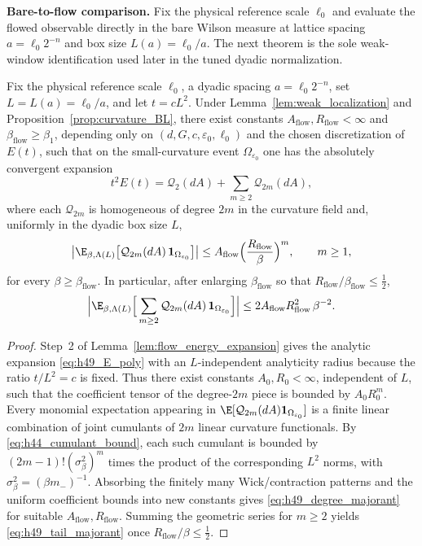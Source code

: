 \medskip
\noindent\textbf{Bare-to-flow comparison.}
Fix the physical reference scale $\ell_0$ and evaluate the flowed observable directly in the bare Wilson measure at lattice spacing
$a=\ell_0 2^{-n}$ and box size $L(a)=\ell_0/a$.
The next theorem is the sole weak-window identification used later in the tuned dyadic normalization.
\begin{lemma}\label{lem:h49_flow_coeff_majorant}
Fix the physical reference scale $\ell_0$, a dyadic spacing $a=\ell_0 2^{-n}$, set $L=L(a)=\ell_0/a$, and let $t=cL^2$.
Under Lemma~\ref{lem:weak_localization} and Proposition~\ref{prop:curvature_BL}, there exist constants $A_{\mathrm{flow}},R_{\mathrm{flow}}<\infty$ and $\beta_{\mathrm{flow}}\ge\beta_1$, depending only on $(d,G,c,\varepsilon_0,\ell_0)$ and the chosen discretization of $E(t)$, such that on the small-curvature event $\Omega_{\varepsilon_0}$ one has the absolutely convergent expansion
\begin{equation}\label{eq:h49_E_poly}
 t^2E(t)=\mathcal Q_2(dA)+\sum_{m\ge 2}\mathcal Q_{2m}(dA),
\end{equation}
where each $\mathcal Q_{2m}$ is homogeneous of degree $2m$ in the curvature field and, uniformly in the dyadic box size $L$,
\begin{equation}\label{eq:h49_degree_majorant}
\big|\E_{\beta,\Lambda(L)}\big[\mathcal Q_{2m}(dA)\,\mathbf 1_{\Omega_{\varepsilon_0}}\big]\big|
\le
A_{\mathrm{flow}}\Big(\frac{R_{\mathrm{flow}}}{\beta}\Big)^m,
\qquad m\ge 1,
\end{equation}
for every $\beta\ge\beta_{\mathrm{flow}}$.
In particular, after enlarging $\beta_{\mathrm{flow}}$ so that $R_{\mathrm{flow}}/\beta_{\mathrm{flow}}\le \tfrac12$,
\begin{equation}\label{eq:h49_tail_majorant}
\Big|\E_{\beta,\Lambda(L)}\Big[\sum_{m\ge 2}\mathcal Q_{2m}(dA)\,\mathbf 1_{\Omega_{\varepsilon_0}}\Big]\Big|
\le
2A_{\mathrm{flow}}R_{\mathrm{flow}}^2\,\beta^{-2}.
\end{equation}
\end{lemma}

\begin{proof}
Step~2 of Lemma~\ref{lem:flow_energy_expansion} gives the analytic expansion \eqref{eq:h49_E_poly} with an $L$-independent analyticity radius because the ratio $t/L^2=c$ is fixed.
Thus there exist constants $A_0,R_0<\infty$, independent of $L$, such that the coefficient tensor of the degree-$2m$ piece is bounded by $A_0R_0^m$.
Every monomial expectation appearing in $\E[\mathcal Q_{2m}(dA)\mathbf 1_{\Omega_{\varepsilon_0}}]$ is a finite linear combination of joint cumulants of $2m$ linear curvature functionals.
By \eqref{eq:h44_cumulant_bound}, each such cumulant is bounded by $(2m-1)!(\sigma_\beta^2)^m$ times the product of the corresponding $L^2$ norms, with $\sigma_\beta^2=(\beta m_-)^{-1}$.
Absorbing the finitely many Wick/contraction patterns and the uniform coefficient bounds into new constants gives \eqref{eq:h49_degree_majorant} for suitable $A_{\mathrm{flow}},R_{\mathrm{flow}}$.
Summing the geometric series for $m\ge 2$ yields \eqref{eq:h49_tail_majorant} once $R_{\mathrm{flow}}/\beta\le\tfrac12$.
\end{proof}

